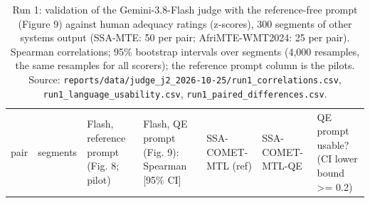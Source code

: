 \begin{table}[t]
\centering
\footnotesize
\setlength{\tabcolsep}{3pt}
\caption{Run 1: validation of the Gemini-3.8-Flash judge with the reference-free prompt (Figure 9) against human adequacy ratings (z-scores), 300 segments of other systems\textquotesingle{} output (SSA-MTE: 50 per pair; AfriMTE-WMT2024: 25 per pair). Spearman correlations; 95\% bootstrap intervals over segments (4,000 resamples, the same resamples for all scorers); the reference prompt column is the pilot\textquotesingle s. Source: \texttt{reports/data/judge\_j2\_2026-10-25/run1\_correlations.csv}, \texttt{run1\_language\_usability.csv}, \texttt{run1\_paired\_differences.csv}.}
\label{tab:t_judge_j2_validation}
{\def\LTcaptype{none} %
\begin{tabular}{@{}
  >{\raggedright\arraybackslash}p{}
  >{\raggedleft\arraybackslash}p{}
  >{\raggedleft\arraybackslash}p{}
  >{\raggedleft\arraybackslash}p{}
  >{\raggedleft\arraybackslash}p{}
  >{\raggedleft\arraybackslash}p{}
  >{\raggedright\arraybackslash}p{}@{}}
\toprule
\begin{minipage}[b]{\linewidth}\raggedright
pair
\end{minipage} & \begin{minipage}[b]{\linewidth}\raggedleft
segments
\end{minipage} & \begin{minipage}[b]{\linewidth}\raggedleft
Flash, reference prompt (Fig. 8; pilot)
\end{minipage} & \begin{minipage}[b]{\linewidth}\raggedleft
Flash, QE prompt (Fig. 9): Spearman {[}95\% CI{]}
\end{minipage} & \begin{minipage}[b]{\linewidth}\raggedleft
SSA-COMET-MTL (ref)
\end{minipage} & \begin{minipage}[b]{\linewidth}\raggedleft
SSA-COMET-MTL-QE
\end{minipage} & \begin{minipage}[b]{\linewidth}\raggedright
QE prompt usable? (CI lower bound \textgreater= 0.2)
\end{minipage} \\

\end{tabular}}
\end{table}
